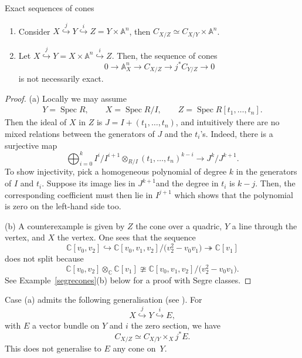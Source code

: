 \documentclass[pdftex]{sigma}
\numberwithin{equation}{section}
\newcommand{\Spec}{\operatorname{Spec}}
\begin{document}
\begin{Example}Exact sequences of cones
\begin{enumerate}\itemsep=0pt
\item[(a)] Consider $X\overset{j}{\hookrightarrow} Y \overset{i}{\hookrightarrow} Z=Y\times\mathbb A^n$, then $C_{X/Z}\simeq C_{X/Y}\times\mathbb A^n$.
\item[(b)] Let $X\overset{j}{\hookrightarrow} Y=X\times\mathbb A^n \overset{i}{\hookrightarrow} Z$. Then, the sequence of cones
\[0\to\mathbb A^n_X\to C_{X/Z}\to j^*C_{Y/Z}\to 0
\] is not necessarily exact.
\end{enumerate}
\end{Example}

\begin{proof}
(a) Locally we may assume
\begin{gather*}Y=\Spec R,\qquad X=\Spec R/I,\qquad Z=\Spec R[t_1,\ldots,t_n].
\end{gather*} Then the ideal of $X$ in $Z$ is $J=I+(t_1,\ldots,t_n)$, and intuitively there are no mixed relations between the generators of $J$ and the $t_i$'s. Indeed, there is a surjective map
\[
 \bigoplus_{i=0}^k I^i/I^{i+1}\otimes_{R/I} (t_1,\ldots,t_n)^{k-i}\to J^k/J^{k+1}.
\]
To show injectivity, pick a homogeneous polynomial of degree $k$ in the generators of $I$ and $t_i$. Suppose its image lies in $J^{k+1}$and the degree in $t_i$ is $k-j$. Then, the corresponding coefficient must then lie in $I^{j+1}$ which shows that the polynomial is zero on the left-hand side too.

(b) A counterexample is given by $Z$ the cone over a quadric, $Y$ a line through the vertex, and $X$ the vertex. One sees that the sequence
\[\mathbb C[v_0,v_2]\hookrightarrow \mathbb C[v_0,v_1,v_2]/\big(v_2^2-v_0v_1\big)\twoheadrightarrow\mathbb C[v_1]\]
does not split because
\[\mathbb C[v_0,v_2]\otimes_{\mathbb C}\mathbb C[v_1]\ncong \mathbb C[v_0,v_1,v_2]/\big(v_2^2-v_0v_1\big).\]
See Example~\ref{segrecones}(b) below for a proof with Segre classes.
\end{proof}

\begin{Remark} Case (a) admits the following generalisation (see \cite[Theorem~6.5]{Fulton}). For
 \[
 X\overset{j}{\hookrightarrow} Y \overset{i}{\hookrightarrow} E,
 \]
 with $E$ a vector bundle on $Y$ and $i$ the zero section, we have
 \[
 C_{X/Z}\simeq C_{X/Y}\times_X j^*E.
 \]
 This does not generalise to $E$ any cone on~$Y$.
\end{Remark}
\end{document}
